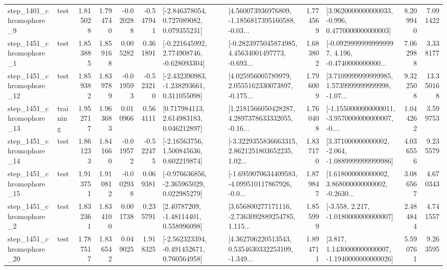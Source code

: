 \begin{tabular}{llrrrrllrlrr}
  step\_1401\_chromophore\_9 &      test &      1.815028 &    1.794740 &     -0.020288 & -0.547941 &    [-2.846378054, 0.727089082, 0.079355231] &  [4.560073936976809, -1.1856817395160588, -0.03... &       1.774569 &   [3.9620000000000033, -0.996, 0.4770000000000003] &            8.209940 &          7.091422 \\
  step\_1451\_chromophore\_1 &      test &      1.853885 &    1.859168 &      0.005282 &  0.361891 &   [-0.221645992, 2.774908746, -0.628093304] &  [-0.2823975045874985, 4.45634001497773, -0.693... &       1.683802 &  [-0.09299999999999997, 4.196, -0.4740000000000... &            7.062988 &          3.338177 \\
 step\_1451\_chromophore\_12 &      test &      1.859382 &    1.839789 &     -0.019593 & -0.523210 &   [-2.432390983, -1.238293661, 0.311055098] &  [4.025956005789979, 2.0555162330073897, -0.175... &       1.796009 &  [3.7109999999999985, 1.5739999999999998, -1.07... &            9.322508 &         13.350168 \\
 step\_1451\_chromophore\_13 &  training &      1.952717 &    1.963683 &      0.010966 &  0.564111 &     [0.717984113, 2.614983183, 0.046212897] &  [1.2181566050428287, 4.2897378633332055, -0.16... &       1.760408 &  [-1.1550000000000011, -3.9570000000000007, -0.... &            1.044262 &          3.599753 \\
 step\_1451\_chromophore\_14 &      test &      1.861233 &    1.841660 &     -0.019572 & -0.522475 &     [-2.16563756, 1.500845636, 0.602219874] &  [-3.3229355836663315, 2.8621251803652235, 1.02... &       1.837170 &   [3.371000000000002, -2.064, -1.0889999999999986] &            4.036556 &          9.235579 \\
 step\_1451\_chromophore\_15 &      test &      1.913751 &    1.910812 &     -0.002938 &  0.069381 &   [-0.976636856, -2.365965029, 0.022985279] &  [-1.6959070634409583, -4.099510117867926, -0.0... &       1.879847 &  [1.618000000000002, 3.868000000000002, -0.2630... &            3.086567 &          4.670343 \\
  step\_1451\_chromophore\_2 &      test &      1.832361 &    1.834100 &      0.001738 &  0.235791 &      [2.40787209, -1.48114401, 0.558996098] &  [3.656800277171116, -2.7363092889254785, 1.115... &       1.855999 &               [-3.558, 2.217, -1.0180000000000007] &            2.484844 &          4.741557 \\
 step\_1451\_chromophore\_20 &      test &      1.787517 &    1.836542 &      0.049025 &  1.918325 &   [-2.562323394, -0.491452671, 0.760564958] &  [4.362706220513543, 0.5354630332253109, -1.349... &       1.894711 &   [3.817, 1.1430000000000007, -1.1940000000000026] &            5.590761 &          9.263595 \\

\end{tabular}
